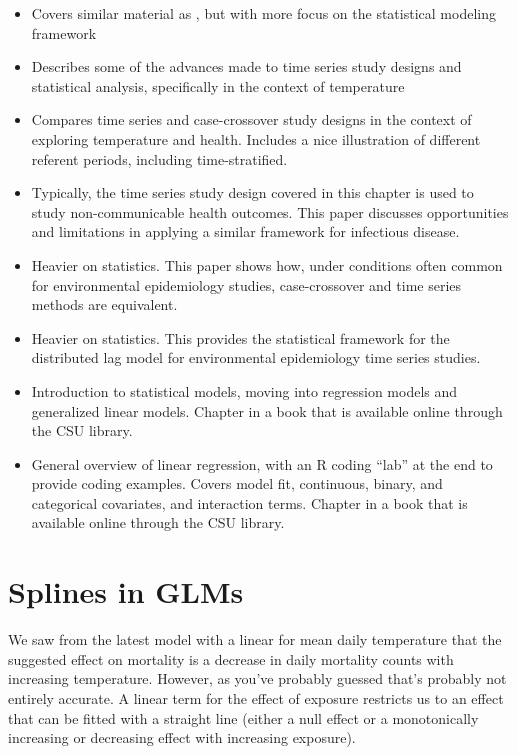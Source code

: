 \documentclass[
]{book}
\providecommand{\tightlist}{%
  \setlength{\itemsep}{0pt}\setlength{\parskip}{0pt}}
\begin{document}
\begin{itemize}
\tightlist
\item
  \citet{armstrong2006models} Covers similar material as \citet{bhaskaran2013time}, but with
  more focus on the statistical modeling framework
\item
  \citet{gasparrini2010time} Describes some of the advances made to time series study
  designs and statistical analysis, specifically in the context of temperature
\item
  \citet{basu2005temperature} Compares time series and case-crossover study designs in
  the context of exploring temperature and health. Includes a nice illustration
  of different referent periods, including time-stratified.
\item
  \citet{imai2015time} Typically, the time series study design covered in this
  chapter is used to study non-communicable health outcomes. This paper discusses
  opportunities and limitations in applying a similar framework for infectious
  disease.
\item
  \citet{lu2007equivalence} Heavier on statistics. This paper shows how, under
  conditions often common for environmental epidemiology studies, case-crossover
  and time series methods are equivalent.
\item
  \citet{gasparrini2014modeling} Heavier on statistics. This provides the statistical
  framework for the distributed lag model for environmental epidemiology time
  series studies.
\item
  \citet{dunn2018generalized1} Introduction to statistical models, moving into regression models and
  generalized linear models. Chapter in a book that is available online through the CSU library.
\item
  \citet{james2013introduction3} General overview of linear regression, with an R coding
  ``lab'' at the end to provide coding examples. Covers model fit, continuous, binary,
  and categorical covariates, and interaction terms. Chapter in a book that is
  available online through the CSU library.
\end{itemize}

\hypertarget{splines-in-glms}{%
\section{Splines in GLMs}\label{splines-in-glms}}

We saw from the latest model with a linear for mean daily temperature that the
suggested effect on mortality is a decrease in daily mortality counts with
increasing temperature. However, as you've probably guessed that's probably not
entirely accurate. A linear term for the effect of exposure restricts us to an
effect that can be fitted with a straight line (either a null effect or a
monotonically increasing or decreasing effect with increasing exposure).
\end{document}
